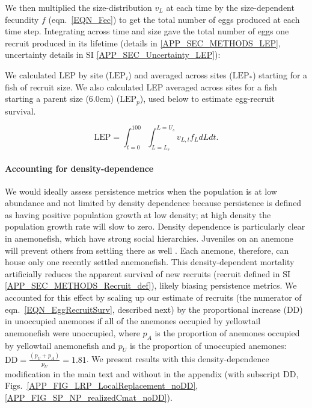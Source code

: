 \documentclass[12pt, oneside]{article}   	%
\begin{document}
We then multiplied the size-distribution $v_L$ at each time by the size-dependent fecundity $f$ (eqn.\ \ref{EQN_Fec}) to get the total number of eggs produced at each time step. Integrating across time and size gave the total number of eggs one recruit produced in its lifetime (details in \ref{APP_SEC_METHODS_LEP}, uncertainty details in SI \ref{APP_SEC_Uncertainty_LEP}): %

We calculated LEP by site ($\text{LEP}_i$) and averaged across sites ($\text{LEP}_*$) starting for a fish of recruit size. We also calculated LEP averaged across sites for a fish starting a parent size (6.0cm) ($\text{LEP}_p$), used below to estimate egg-recruit survival.


\begin{equation}
\text{LEP} = \int_{t=0}^{100}\int_{L=L_s}^{L=U_s} v_{L,t} f_L dL dt. \label{EQN_LEP}
\end{equation}

\paragraph*{Accounting for density-dependence}  %

We would ideally assess persistence metrics when the population is at low abundance and not limited by density dependence because persistence is defined as having positive population growth at low density; at high density the population growth rate will slow to zero. Density dependence is particularly clear in anemonefish, which have strong social hierarchies. Juveniles on an anemone will prevent others from settling there as well \citep[seen in \textit{A. percula,}][]{buston2003forcible}. Each anemone, therefore, can house only one recently settled anemonefish. This density-dependent mortality artificially reduces the apparent survival of new recruits (recruit defined in SI \ref{APP_SEC_METHODS_Recruit_def}), likely biasing persistence metrics. We accounted for this effect by scaling up our estimate of recruits (the numerator of eqn.\ \ref{EQN_EggRecruitSurv}, described next) by the proportional increase ($\text{DD}$) in unoccupied anemones if all of the anemones occupied by yellowtail anemonefish were unoccupied, where $p_A$ is the proportion of anemones occupied by yellowtail anemonefish and $p_U$ is the proportion of unoccupied anemones: $\text{DD} = \frac{(p_U + p_A)}{p_U} = 1.81$. We present results with this density-dependence modification in the main text and without in the appendix (with subscript DD, Figs.\ \ref{APP_FIG_LRP_LocalReplacement_noDD}, \ref{APP_FIG_SP_NP_realizedCmat_noDD}).
\end{document}
